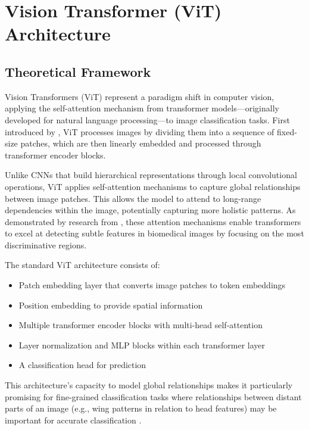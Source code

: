 


\section{Vision Transformer (ViT) Architecture}

\subsection{Theoretical Framework}

Vision Transformers (ViT) represent a paradigm shift in computer vision, applying the self-attention mechanism from transformer models—originally developed for natural language processing—to image classification tasks. First introduced by \citep{dosovitskiy2020image}, ViT processes images by dividing them into a sequence of fixed-size patches, which are then linearly embedded and processed through transformer encoder blocks.

Unlike CNNs that build hierarchical representations through local convolutional operations, ViT applies self-attention mechanisms to capture global relationships between image patches. This allows the model to attend to long-range dependencies within the image, potentially capturing more holistic patterns. As demonstrated by research from \citep{liu2022attention}, these attention mechanisms enable transformers to excel at detecting subtle features in biomedical images by focusing on the most discriminative regions.

The standard ViT architecture consists of:

\begin{itemize}
    \item Patch embedding layer that converts image patches to token embeddings
    \item Position embedding to provide spatial information
    \item Multiple transformer encoder blocks with multi-head self-attention
    \item Layer normalization and MLP blocks within each transformer layer
    \item A classification head for prediction
\end{itemize}

This architecture's capacity to model global relationships makes it particularly promising for fine-grained classification tasks where relationships between distant parts of an image (e.g., wing patterns in relation to head features) may be important for accurate classification \citep{conde2021exploring}.

